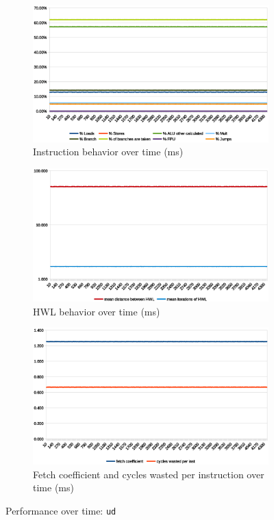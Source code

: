 \documentclass[../bachelor_paper.tex]{subfiles}
\begin{document}
\begin{figure}
    \begin{subfigure}{0.45\textwidth}
        \includegraphics[width=\textwidth]{img/graph/embench/ud_inst.eps}
        \caption{Instruction behavior over time (ms)}
    \end{subfigure}
    \begin{subfigure}{0.45\textwidth}
        \includegraphics[width=\textwidth]{img/graph/embench/ud_hwl.eps}
        \caption{\ac{HWL} behavior over time (ms)}
    \end{subfigure}
    \begin{subfigure}{0.45\textwidth}
        \includegraphics[width=\textwidth]{img/graph/embench/ud_fetch_waste.eps}
        \caption{Fetch coefficient and cycles wasted per instruction over time (ms)}
    \end{subfigure}
    \caption{Performance over time: \texttt{ud}}
\end{figure}
\end{document}
